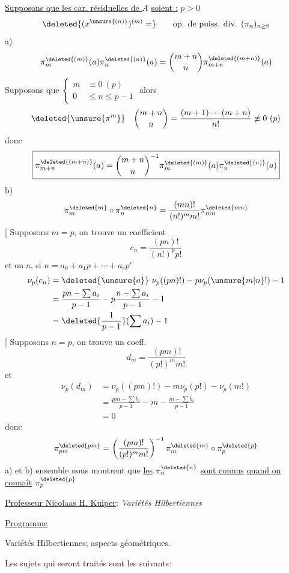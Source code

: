 \uline{Supposons que les car. résiduelles de $A$} \uline{soient :} $p>0$
\[
\deleted{(x^{\unsure{(n)}})^{(m)}=}\qquad\text{op. de puiss. div. }(\pi_n)_{n\geq0}
\]
a)
\[
\pi_m^{\deleted{(m)}}(a)\pi_n^{\deleted{(n)}}(a)=\binom{m+n}{n}\pi_{m+n}^{\deleted{(m+n)}}(a)
\]
Supposons que $\left\{\begin{aligned}m&\equiv0\ (p)\\0&\leq n\leq p-1\end{aligned}\right.$ alors
\[
\deleted{\unsure{\pi^m}}\quad\binom{m+n}{n}=\frac{(m+1)\cdots(m+n)}{n!}\not\equiv0\ (p)
\]
donc
\[
\boxed{\pi_{m+n}^{\deleted{(m+n)}}(a)=\binom{m+n}{n}^{-1}\pi_m^{\deleted{(m)}}(a)\pi_n^{\deleted{(n)}}(a)}
\]
b)
\[
\pi_m^{\deleted{m}}\circ\pi_n^{\deleted{n}}=\frac{(mn)!}{(n!)^m m!}\pi_{mn}^{\deleted{mn}}
\]
[ Supposons $m=p$, on trouve un coefficient
\[
c_n=\frac{(pn)!}{(n!)^p p!}
\]
et on a, si $n=a_0+a_1p+\cdots+a_rp^r$
\[
\begin{aligned}
\nu_p(c_n)&=\deleted{\unsure{a}}\ \nu_p((pn)!)-p\nu_p(\unsure{m|n}!)-1\\
&=\frac{pn-\sum a_i}{p-1}-p\frac{n-\sum a_i}{p-1}-1\\
&=\deleted{\frac{1}{p-1}}(\sum a_i)-1
\end{aligned}
\]
]
Supposons $n=p$, on trouve un coeff.
\[
d_m=\frac{(pm)!}{(p!)^m m!}
\]
et
\[
\begin{aligned}
\nu_p(d_m)&=\nu_p((pm)!)-m\nu_p(p!)-\nu_p(m!)\\
&=\frac{pm-\sum b_i}{p-1}-m-\frac{m-\sum b_i}{p-1}\\
&=0
\end{aligned}
\]
donc
\[
\pi_{pm}^{\deleted{pm}}=\left(\frac{(pm)!}{(p!)^m m!}\right)^{-1}\pi_m^{\deleted{m}}\circ\pi_p^{\deleted{p}}
\]
a) et b) ensemble nous montrent que \uline{les} $\pi_n^{\deleted{n}}$ \uline{sont connus} \uline{quand on connaît} $\pi_p^{\deleted{p}}$


\uline{Professeur Nicolaas H. Kuiper}: \textit{Variétés Hilbertiennes}

\uline{Programme}

Variétés Hilbertiennes; aspects géométriques.

Les sujets qui seront traités sont les suivants:

